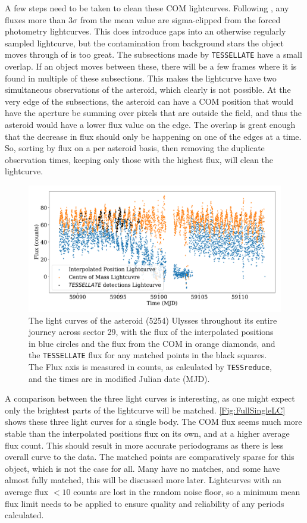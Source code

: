 \documentclass{UCreport}
\begin{document}
A few steps need to be taken to clean these COM lightcurves.
Following \citet{McNeill2023}, any fluxes more than $3\sigma$ from the mean value are sigma-clipped from the forced photometry lightcurves.
This does introduce gaps into an otherwise regularly sampled lightcurve, but the contamination from background stars the object moves through of is too great.
The subsections made by \texttt{TESSELLATE} have a small overlap.
If an object moves between these, there will be a few frames where it is found in multiple of these subsections.
This makes the lightcurve have two simultaneous observations of the asteroid, which clearly is not possible.
At the very edge of the subsections, the asteroid can have a COM position that would have the aperture be summing over pixels that are outside the field, and thus the asteroid would have a lower flux value on the edge.
The overlap is great enough that the decrease in flux should only be happening on one of the edges at a time.
So, sorting by flux on a per asteroid basis, then removing the duplicate observation times, keeping only those with the highest flux, will clean the lightcurve.


\begin{figure}
  \centering
  \includegraphics[width =\textwidth]{../OzData/SingleBodyLCUlyssesCorrectedAgain.pdf}
  \caption[Light curves Example]{The light curves of the asteroid (5254) Ulysses throughout its entire journey across sector 29, with the flux of the interpolated positions in blue circles and the flux from the COM in orange diamonds, and the \texttt{TESSELLATE} flux for any matched points in the black squares.
    The Flux axis is measured in counts, as calculated by \texttt{TESSreduce}, and the times are in modified Julian date (MJD).}
  \label{Fig:FullSingleLC}
\end{figure}
A comparison between the three light curves is interesting, as one might expect only the brightest parts of the lightcurve will be matched.
\autoref{Fig:FullSingleLC} shows these three light curves for a single body.
The COM flux seems much more stable than the interpolated positions flux on its own, and at a higher average flux count.
This should result in more accurate periodograms as there is less overall curve to the data.
The matched points are comparatively sparse for this object, which is not the case for all.
Many have no matches, and some have almost fully matched, this will be discussed more later.
Lightcurves with an average flux $<10$ counts are lost in the random noise floor, so a minimum mean flux limit needs to be applied to ensure quality and reliability of any periods calculated.
\end{document}
